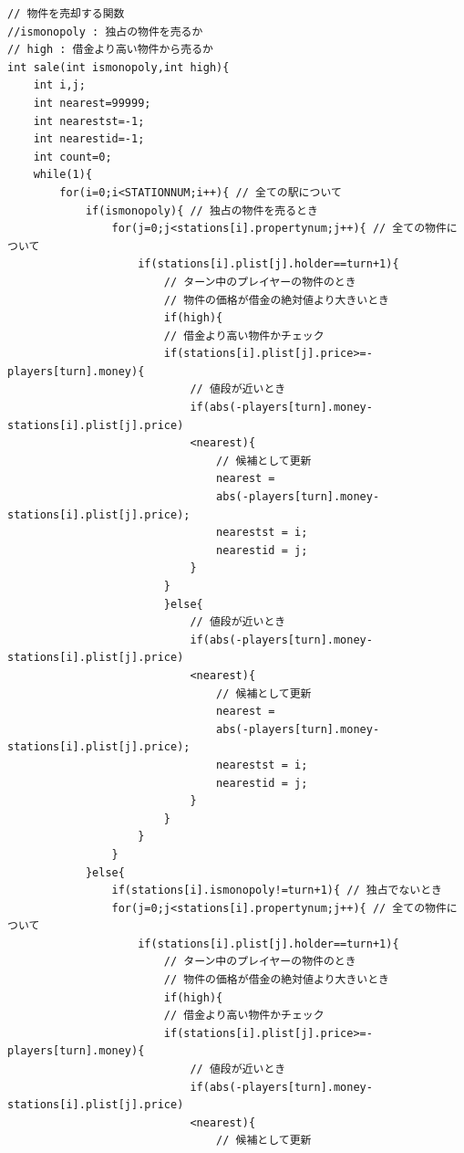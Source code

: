 \documentclass[a4j]{jarticle}
\begin{document}
\begin{lstlisting}[basicstyle=\ttfamily\footnotesize, frame=single,label=code2,caption=game.c]
// 物件を売却する関数
//ismonopoly : 独占の物件を売るか
// high : 借金より高い物件から売るか
int sale(int ismonopoly,int high){
    int i,j;
    int nearest=99999;
    int nearestst=-1;
    int nearestid=-1;
    int count=0;
    while(1){
        for(i=0;i<STATIONNUM;i++){ // 全ての駅について
            if(ismonopoly){ // 独占の物件を売るとき
                for(j=0;j<stations[i].propertynum;j++){ // 全ての物件について
                    if(stations[i].plist[j].holder==turn+1){ 
                        // ターン中のプレイヤーの物件のとき
                        // 物件の価格が借金の絶対値より大きいとき
                        if(high){
                        // 借金より高い物件かチェック
                        if(stations[i].plist[j].price>=-players[turn].money){
                            // 値段が近いとき
                            if(abs(-players[turn].money-stations[i].plist[j].price)
                            <nearest){
                                // 候補として更新
                                nearest = 
                                abs(-players[turn].money-stations[i].plist[j].price);
                                nearestst = i;
                                nearestid = j;                              
                            }
                        }
                        }else{
                            // 値段が近いとき
                            if(abs(-players[turn].money-stations[i].plist[j].price)
                            <nearest){
                                // 候補として更新
                                nearest = 
                                abs(-players[turn].money-stations[i].plist[j].price);
                                nearestst = i;
                                nearestid = j;                              
                            }
                        }
                    }
                }
            }else{
                if(stations[i].ismonopoly!=turn+1){ // 独占でないとき
                for(j=0;j<stations[i].propertynum;j++){ // 全ての物件について
                    if(stations[i].plist[j].holder==turn+1){ 
                        // ターン中のプレイヤーの物件のとき
                        // 物件の価格が借金の絶対値より大きいとき
                        if(high){
                        // 借金より高い物件かチェック
                        if(stations[i].plist[j].price>=-players[turn].money){
                            // 値段が近いとき
                            if(abs(-players[turn].money-stations[i].plist[j].price)
                            <nearest){
                                // 候補として更新

\end{lstlisting}
\end{document}
